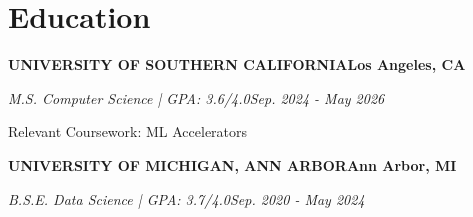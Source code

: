 \documentclass[10pt]{article}
\renewcommand{\note}[1]{#1\par}
\newcommand{\school}[4]{%
  \vspace{2pt}%
  \textbf{\MakeUppercase{#1}}\hfill\textbf{#2}\par
  \vspace{0.5pt}%
  \textit{#3}\hfill\textit{#4}\par
}
\begin{document}
\section{Education}
\vspace{-2pt}
\school{University of Southern California}{Los Angeles, CA}{M.S. Computer Science | GPA: 3.6/4.0}{Sep. 2024 - May 2026}
\note{Relevant Coursework: ML Accelerators}

\school{University of Michigan, Ann Arbor}{Ann Arbor, MI}{B.S.E. Data Science | GPA: 3.7/4.0}{Sep. 2020 - May 2024}
\end{document}
